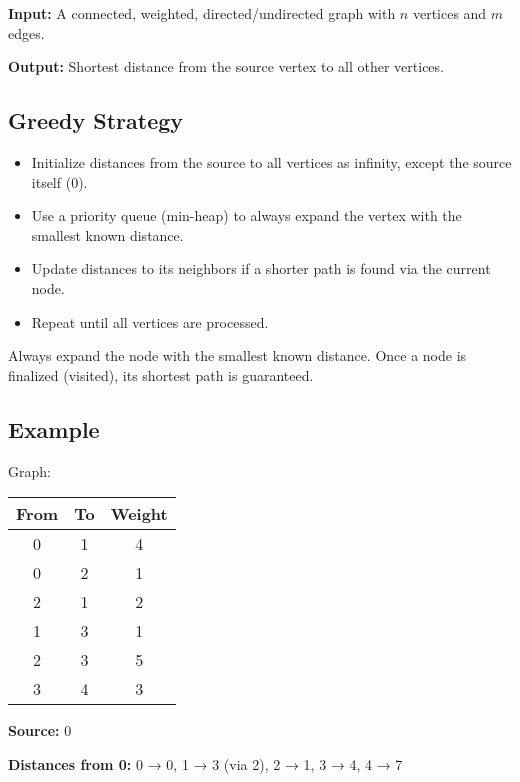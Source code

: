 \documentclass[14pt]{extarticle}
\begin{document}
\textbf{Input:}  
A connected, weighted, directed/undirected graph with $n$ vertices and $m$ edges.

\textbf{Output:}  
Shortest distance from the source vertex to all other vertices.

\newpage

\subsection*{Greedy Strategy}

\begin{itemize}
    \item Initialize distances from the source to all vertices as infinity, except the source itself (0).
    \item Use a priority queue (min-heap) to always expand the vertex with the smallest known distance.
    \item Update distances to its neighbors if a shorter path is found via the current node.
    \item Repeat until all vertices are processed.
\end{itemize}

\begin{tcolorbox}[colback=white, colframe=black, title=Key Idea]
Always expand the node with the smallest known distance. Once a node is finalized (visited), its shortest path is guaranteed.
\end{tcolorbox}

\subsection*{Example}

Graph:

\begin{center}
\begin{tabular}{|c|c|c|}
\hline
From & To & Weight \\
\hline
0 & 1 & 4 \\
0 & 2 & 1 \\
2 & 1 & 2 \\
1 & 3 & 1 \\
2 & 3 & 5 \\
3 & 4 & 3 \\
\hline
\end{tabular}
\end{center}

\textbf{Source:} 0

\textbf{Distances from 0:}  
0 → 0,  
1 → 3 (via 2),  
2 → 1,  
3 → 4,  
4 → 7
\end{document}
